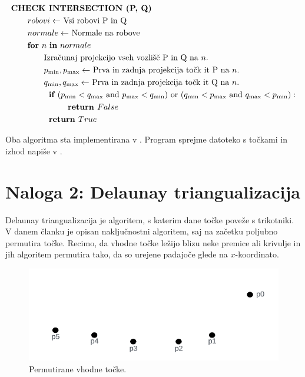 \documentclass[fleqn]{article}
\begin{document}
\begin{align*}
    &\textbf{CHECK INTERSECTION (P, Q)} \\
    &\text{\qquad $robovi \leftarrow$ Vsi robovi P in Q} \\
    &\text{\qquad $normale \leftarrow$ Normale na robove} \\
    &\text{\qquad \textbf{for} $n$ \textbf{in} $normale$} \\
    &\text{\qquad \qquad Izračunaj projekcijo vseh vozlišč P in Q na $n$.} \\
    &\text{\qquad \qquad $p_{\min}, p_{\max} \leftarrow$ Prva in zadnja projekcija točk it P na $n$. } \\
    &\text{\qquad \qquad $q_{\min}, q_{\max} \leftarrow$ Prva in zadnja projekcija točk it Q na $n$. } \\
    &\textbf{\qquad \qquad if } (p_{\min} < q_{\max} \text{ and } p_{\max} < q_{\min}) \text{ or } (q_{\min} < p_{\max} \text{ and } q_{\max} < p_{\min}): \\
    &\textbf{\qquad \qquad \qquad return } False \\
    &\textbf{\qquad \qquad return } True \\
\end{align*}

Oba algoritma sta implementirana v . Program sprejme datoteko s točkami  in izhod napiše v .

\pagebreak
\section*{Naloga 2: Delaunay triangualizacija}

Delaunay triangualizacija je algoritem, s katerim dane točke poveže s trikotniki. 
V danem članku je opisan naključnostni algoritem, saj na začetku poljubno permutira točke.
Recimo, da vhodne točke ležijo blizu neke premice ali krivulje in jih algoritem permutira tako, da so urejene padajoče glede na $x$-koordinato.

\begin{figure}[h!]
    \centering
    \includegraphics[width=0.7\linewidth]{tocke.png}
    \caption{Permutirane vhodne točke.}
    \label{tocke}
\end{figure}
\end{document}
